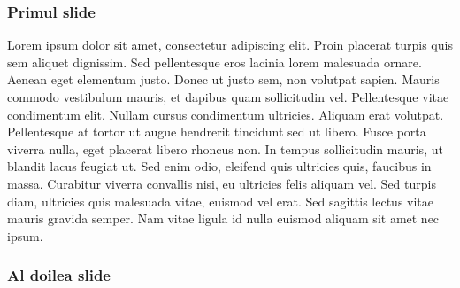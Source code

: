 \documentclass{beamer}
\begin{document}
 
\maketitle \begin{frame} 
\frametitle{Primul slide} 
Lorem ipsum dolor sit amet, consectetur adipiscing elit. Proin placerat turpis quis sem aliquet dignissim. Sed pellentesque eros lacinia lorem malesuada ornare. Aenean eget elementum justo. Donec ut justo sem, non volutpat sapien. Mauris commodo vestibulum mauris, et dapibus quam sollicitudin vel. Pellentesque vitae condimentum elit. Nullam cursus condimentum ultricies. Aliquam erat volutpat. Pellentesque at tortor ut augue hendrerit tincidunt sed ut libero. Fusce porta viverra nulla, eget placerat libero rhoncus non. In tempus sollicitudin mauris, ut blandit lacus feugiat ut. Sed enim odio, eleifend quis ultricies quis, faucibus in massa. Curabitur viverra convallis nisi, eu ultricies felis aliquam vel. Sed turpis diam, ultricies quis malesuada vitae, euismod vel erat. Sed sagittis lectus vitae mauris gravida semper. Nam vitae ligula id nulla euismod aliquam sit amet nec ipsum.
\end{frame} 
\begin{frame} 
\frametitle{Al doilea slide} 

\end{frame} 
\end{document}
